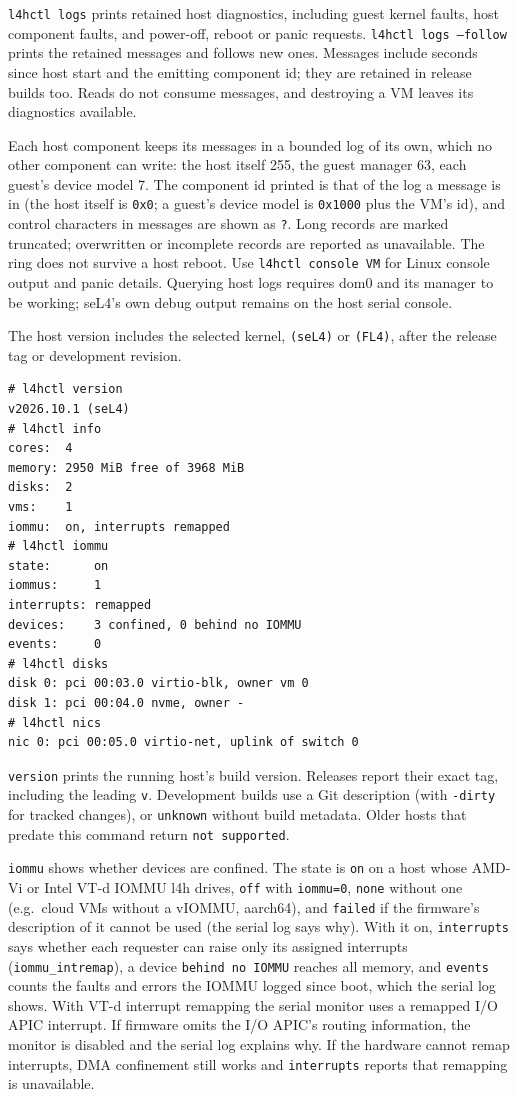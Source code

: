\documentclass[11pt,a4paper]{report}
\newcommand{\cmd}[1]{\texttt{#1}}
\begin{document}
\cmd{l4hctl logs} prints retained host diagnostics, including guest kernel
faults, host component faults, and power-off, reboot or panic requests.
\cmd{l4hctl logs --follow} prints the retained messages and follows new
ones. Messages include seconds since host start and the emitting component
id; they are retained in release builds too. Reads do not consume messages,
and destroying a VM leaves its diagnostics available.

Each host component keeps its messages in a bounded log of its own, which
no other component can write: the host itself 255, the guest manager 63,
each guest's device model 7. The component id printed is that of the log a
message is in (the host itself is \texttt{0x0}; a guest's device model is
\texttt{0x1000} plus the VM's id), and control characters in messages are
shown as \texttt{?}.
Long records are marked truncated; overwritten or incomplete records are
reported as unavailable. The ring
does not survive a host reboot. Use \cmd{l4hctl console VM} for Linux console
output and panic details. Querying host logs requires dom0 and its manager
to be working; seL4's own debug output remains on the host serial console.

The host version includes the selected kernel, \texttt{(seL4)} or
\texttt{(FL4)}, after the release tag or development revision.
\begin{lstlisting}
# l4hctl version
v2026.10.1 (seL4)
# l4hctl info
cores:  4
memory: 2950 MiB free of 3968 MiB
disks:  2
vms:    1
iommu:  on, interrupts remapped
# l4hctl iommu
state:      on
iommus:     1
interrupts: remapped
devices:    3 confined, 0 behind no IOMMU
events:     0
# l4hctl disks
disk 0: pci 00:03.0 virtio-blk, owner vm 0
disk 1: pci 00:04.0 nvme, owner -
# l4hctl nics
nic 0: pci 00:05.0 virtio-net, uplink of switch 0
\end{lstlisting}

\cmd{version} prints the running host's build version. Releases report
their exact tag, including the leading \texttt{v}. Development builds use
a Git description (with \texttt{-dirty} for tracked changes), or
\texttt{unknown} without build metadata. Older hosts that predate this
command return \texttt{not supported}.

\cmd{iommu} shows whether devices are confined. The state is \texttt{on}
on a host whose AMD-Vi or Intel VT-d IOMMU l4h drives, \texttt{off} with \texttt{iommu=0},
\texttt{none} without one (e.g.\ cloud VMs without a vIOMMU, aarch64), and
\texttt{failed} if the firmware's description of it cannot be used (the
serial log says why). With it on, \texttt{interrupts} says whether each
requester can raise only its assigned interrupts (\texttt{iommu\_intremap}), a
device \texttt{behind no IOMMU} reaches all memory, and \texttt{events}
counts the faults and errors the IOMMU logged since boot, which the serial
log shows. With VT-d interrupt remapping the serial monitor uses a remapped
I/O APIC interrupt. If firmware omits the I/O APIC's routing information,
the monitor is disabled and the serial log explains why. If the
hardware cannot remap interrupts, DMA confinement still works and
\texttt{interrupts} reports that remapping is unavailable.
\end{document}

